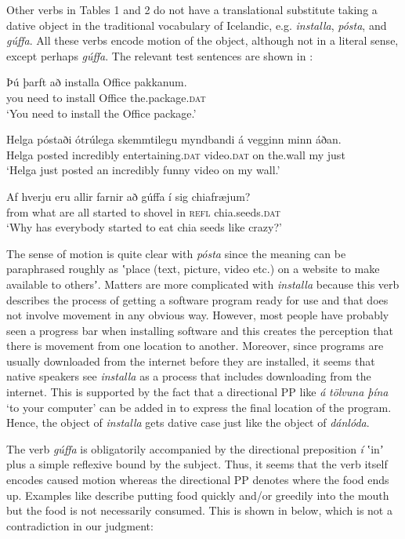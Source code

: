 \documentclass[output=paper,modfonts,nonflat,colorlinks,citecolor=brown]{langsci/langscibook}
\begin{document}
Other verbs in Tables 1 and 2 do not have a translational substitute taking a dative object in the traditional vocabulary of Icelandic, e.g. \textit{installa}, \textit{pósta}, and \textit{gúffa}. All these verbs encode motion of the object, although not in a literal sense, except perhaps \textit{gúffa}. The relevant test sentences are shown in :


\ea%
    \label{ex:jonsson:3}
\ea\label{ex:jonsson:3a}
\gll   Þú   þarft   að   installa   Office   pakkanum.\\
     you   need   to   install   Office   the.package.\textsc{dat}\\
\glt `You need to install the Office package.'

\ex\label{ex:jonsson:3b}
\gll   Helga  póstaði  ótrúlega  skemmtilegu  myndbandi  á  vegginn  minn  áðan.\\
 Helga   posted   incredibly   entertaining.\textsc{dat}   video.\textsc{dat}   on   the.wall   my   just\\
\glt `Helga just posted an incredibly funny video on my wall.'


\ex\label{ex:jonsson:3c}
\gll   Af hverju eru allir farnir að gúffa í sig chiafræjum?\\
 from what are all started to shovel in \textsc{refl} chia.seeds.\textsc{dat}\\
\glt `Why has everybody started to eat chia seeds like crazy?'
\z
\z

The sense of motion is quite clear with \textit{pósta} since the meaning can be paraphrased roughly as ʽplace (text, picture, video etc.) on a website to make available to othersʼ. Matters are more complicated with \textit{installa} because this verb describes the process of getting a software program ready for use and that does not involve movement in any obvious way. However, most people have probably seen a progress bar when installing software and this creates the perception that there is movement from one location to another. Moreover, since programs are usually downloaded from the internet before they are installed, it seems that native speakers see \textit{installa} as a process that includes downloading from the internet. This is supported by the fact that a directional PP like \textit{á} \textit{tölvuna} \textit{þína} ‘to your computer’ can be added in  to express the final location of the program. Hence, the object of \textit{installa} gets dative case just like the object of \textit{dánlóda}.

The verb \textit{gúffa} is obligatorily accompanied by the directional preposition \textit{í} ʽinʼ plus a simple reflexive bound by the subject. Thus, it seems that the verb itself encodes caused motion whereas the directional PP denotes where the food ends up. Examples like  describe putting food quickly and/or greedily into the mouth but the food is not necessarily consumed. This is shown in  below, which is not a contradiction in our judgment:
\end{document}

